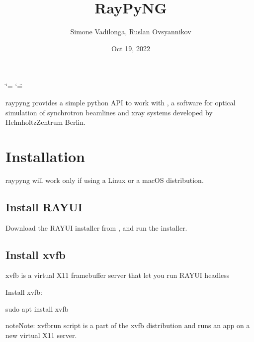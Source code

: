 \documentclass[letterpaper,10pt,english]{sphinxmanual}
\title{RayPyNG}
\date{Oct 19, 2022}
\author{Simone Vadilonga, Ruslan Ovsyannikov}
\begin{document}
\ifdefined\shorthandoff
  \ifnum\catcode`\=\string=\active\shorthandoff{=}\fi
  \ifnum\catcode`\"=\active{}\fi
\fi

\pagestyle{empty}
\sphinxmaketitle
\pagestyle{plain}
\sphinxtableofcontents
\pagestyle{normal}
\label{\detokenize{index::doc}}


\sphinxAtStartPar
raypyng provides a simple python API to work with
,
a software for optical simulation of synchrotron
beamlines and x\sphinxhyphen{}ray systems developed by
Helmholtz\sphinxhyphen{}Zentrum Berlin.

\sphinxstepscope


\chapter{Installation}
\label{\detokenize{installation:installation}}\label{\detokenize{installation::doc}}
\sphinxAtStartPar
raypyng will work only if using a Linux or a macOS distribution.


\section{Install RAY\sphinxhyphen{}UI}
\label{\detokenize{installation:install-ray-ui}}
\sphinxAtStartPar
Download the RAY\sphinxhyphen{}UI installer from  ,
and run the installer.


\section{Install xvfb}
\label{\detokenize{installation:install-xvfb}}
\sphinxAtStartPar
xvfb is a virtual X11 framebuffer server that let you run RAY\sphinxhyphen{}UI headless

\sphinxAtStartPar
Install xvfb:

\begin{sphinxVerbatim}[commandchars=\\\{\}]
sudo apt install xvfb
\end{sphinxVerbatim}

\begin{sphinxadmonition}{note}{Note:}
\sphinxAtStartPar
xvfb\sphinxhyphen{}run script is a part of the xvfb distribution and
runs an app on a new virtual X11 server.
\end{sphinxadmonition}
\end{document}
